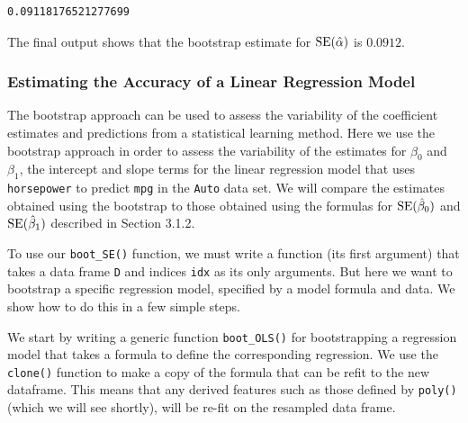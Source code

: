 \documentclass[11pt]{article}
\makeatletter
\newcommand{\boxspacing}{\kern\kvtcb@left@rule\kern\kvtcb@boxsep}
\newcommand{\prompt}[4]{
        {\ttfamily\llap{{\color{#2}[#3]:\hspace{3pt}#4}}\vspace{-\baselineskip}}
    }
\makeatother
\begin{document}
            \begin{tcolorbox}[breakable, size=fbox, boxrule=.5pt, pad at break*=1mm, opacityfill=0]
\prompt{Out}{outcolor}{19}{\boxspacing}
\begin{Verbatim}[commandchars=\\\{\}]
0.09118176521277699
\end{Verbatim}
\end{tcolorbox}
        
    The final output shows that the bootstrap estimate for
\({\rm SE}(\hat{\alpha})\) is \(0.0912\).

\hypertarget{estimating-the-accuracy-of-a-linear-regression-model}{%
\subsubsection{Estimating the Accuracy of a Linear Regression
Model}\label{estimating-the-accuracy-of-a-linear-regression-model}}

The bootstrap approach can be used to assess the variability of the
coefficient estimates and predictions from a statistical learning
method. Here we use the bootstrap approach in order to assess the
variability of the estimates for \(\beta_0\) and \(\beta_1\), the
intercept and slope terms for the linear regression model that uses
\texttt{horsepower} to predict \texttt{mpg} in the \texttt{Auto} data
set. We will compare the estimates obtained using the bootstrap to those
obtained using the formulas for \({\rm SE}(\hat{\beta}_0)\) and
\({\rm SE}(\hat{\beta}_1)\) described in Section 3.1.2.

To use our \texttt{boot\_SE()} function, we must write a function (its
first argument) that takes a data frame \texttt{D} and indices
\texttt{idx} as its only arguments. But here we want to bootstrap a
specific regression model, specified by a model formula and data. We
show how to do this in a few simple steps.

We start by writing a generic function \texttt{boot\_OLS()} for
bootstrapping a regression model that takes a formula to define the
corresponding regression. We use the \texttt{clone()} function to make a
copy of the formula that can be refit to the new dataframe. This means
that any derived features such as those defined by \texttt{poly()}
(which we will see shortly), will be re-fit on the resampled data frame.
\end{document}
